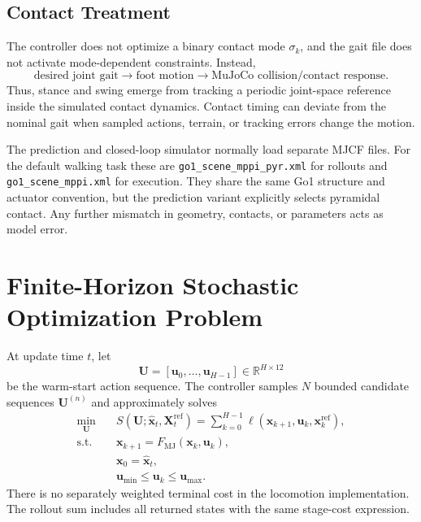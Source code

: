 \documentclass[11pt,a4paper]{article}
\newcommand{\R}{\mathbb{R}}
\newcommand{\code}[1]{\texttt{#1}}
\begin{document}
\subsection{Contact Treatment}

The controller does not optimize a binary contact mode
$\sigma_k$, and the gait file does not activate mode-dependent constraints.
Instead,
\begin{equation}
  \text{desired joint gait}
  \longrightarrow \text{foot motion}
  \longrightarrow \text{MuJoCo collision/contact response}.
\end{equation}
Thus, stance and swing emerge from tracking a periodic joint-space reference
inside the simulated contact dynamics.  Contact timing can deviate from the
nominal gait when sampled actions, terrain, or tracking errors change the
motion.

The prediction and closed-loop simulator normally load separate MJCF files.
For the default walking task these are \code{go1\_scene\_mppi\_pyr.xml} for
rollouts and \code{go1\_scene\_mppi.xml} for execution.  They share the same
Go1 structure and actuator convention, but the prediction variant explicitly
selects pyramidal contact.  Any further mismatch in geometry, contacts, or
parameters acts as model error.

\section{Finite-Horizon Stochastic Optimization Problem}

At update time $t$, let
\begin{equation}
  \bm{U}=[\bm{u}_0,\ldots,\bm{u}_{H-1}]\in\R^{H\times12}
\end{equation}
be the warm-start action sequence.  The controller samples $N$ bounded
candidate sequences $\bm{U}^{(n)}$ and approximately solves
\begin{equation}
  \boxed{
  \begin{aligned}
  \min_{\bm{U}}\quad &
    S(\bm{U};\hat{\bm{x}}_t,\bm{X}^{\mathrm{ref}}_t)
    =\sum_{k=0}^{H-1}
      \ell(\bm{x}_{k+1},\bm{u}_k,\bm{x}^{\mathrm{ref}}_k),\\
  \text{s.t.}\quad &
    \bm{x}_{k+1}=F_{\mathrm{MJ}}(\bm{x}_k,\bm{u}_k),\\
  & \bm{x}_0=\hat{\bm{x}}_t,\\
  & \bm{u}_{\min}\leq\bm{u}_k\leq\bm{u}_{\max}.
  \end{aligned}}
  \label{eq:stochastic_ocp}
\end{equation}
There is no separately weighted terminal cost in the locomotion
implementation.  The rollout sum includes all returned states with the same
stage-cost expression.
\end{document}
